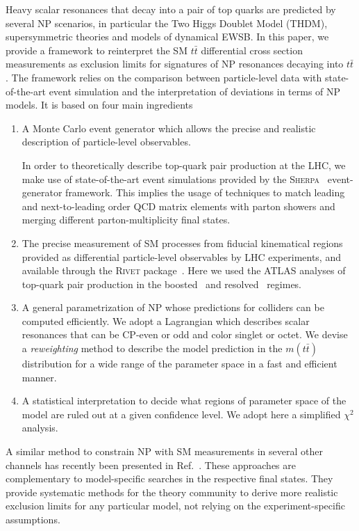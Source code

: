 \documentclass[aps,prd,amsmath,amssymb,superscriptaddress, preprintnumbers,preprint,nofootinbib,a4paper]{revtex4}
\newcommand{\ttb}{t\bar{t}}
\def\Sherpa{\textsc{Sherpa}}
\begin{document}
Heavy scalar resonances that decay into a pair of top quarks are predicted by several NP scenarios,
in particular the Two Higgs Doublet Model (THDM), supersymmetric theories and models of dynamical EWSB.
In this paper, we provide a framework to reinterpret the SM $\ttb$ differential cross section measurements as exclusion limits for signatures of NP resonances decaying into $\ttb$.
The framework relies on the comparison between particle-level data with state-of-the-art event simulation
and the interpretation of deviations in terms of NP models.  It is based on four main ingredients
%
\begin{enumerate}
\item 
A Monte Carlo event generator which allows the precise and realistic description of particle-level observables. 
 
In order to theoretically describe top-quark pair production at the LHC, we make use of state-of-the-art
event simulations provided by the \Sherpa~\cite{Gleisberg:2008ta} event-generator framework. This implies
the usage of techniques to match leading and next-to-leading order QCD matrix elements with parton showers 
and merging different parton-multiplicity final states.
\item The precise measurement of SM processes from fiducial kinematical regions provided as differential
  particle-level observables by LHC experiments, and available through the \textsc{Rivet}
  package~\cite{Buckley:2010ar}. Here we used the ATLAS analyses of top-quark pair production in the
  boosted~\cite{Aad:2015hna} and resolved~\cite{Aad:2015mbv} regimes.
\item A general parametrization of NP whose predictions for colliders can be computed efficiently.
  We adopt a Lagrangian which describes scalar resonances that can be CP-even or odd and color singlet
  or octet. We devise a \emph{reweighting} method to describe the model prediction  in the $m(\ttb)$
  distribution for a wide range of the parameter space in a fast and efficient manner. 
\item A statistical interpretation to decide what regions of parameter space of the model are ruled
  out at a given confidence level. We adopt here a simplified $\chi^2$ analysis.
\end{enumerate}
A similar method to constrain NP with SM measurements in several other channels has recently been
presented in Ref.~\cite{Butterworth:2016sqg}.
  These approaches are complementary to model-specific searches in the respective final states. 
  They provide systematic methods for the theory community to derive more realistic exclusion limits
  for any particular model, not relying on the experiment-specific assumptions. 
\end{document}
